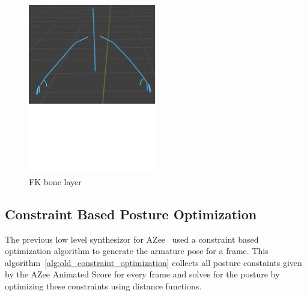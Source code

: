 \documentclass[../../main.tex]{subfiles}
\begin{document}
\begin{figure}
    \centering
    \includegraphics[width=0.5\textwidth]{chapters/rigging_layers/images/fk_layer.png}
    \caption{FK bone layer}
    \label{fig:fk_layer}
\end{figure}

\subsection{Constraint Based Posture Optimization}
\label{ch:rigging_layers:proc_rig_signing_avatars:cb_posegen}

The previous low level synthesizor for AZee~\cite{nunnari2018animating} used a constraint based optimization algorithm to generate the armature pose for a frame. This algorithm~\ref{alg:old_constraint_optimization} collects all posture constaints given by the AZee Animated Score for every frame and solves for the posture by optimizing these constraints using distance functions. 
\end{document}
